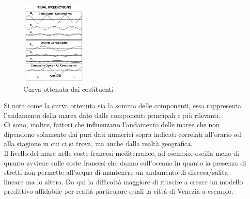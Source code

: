 \begin{figure}[H]
    \centering
    \includegraphics[width=0.3\textwidth]{res/cap 2/Tidal_constituent_sum.png}
    \caption{Curva ottenuta dai costituenti}
\end{figure}

Si nota come la curva ottenuta sia la somma delle componenti, essa rappresenta l'andamento della marea dato dalle componenti principali e più rilevanti.\\
Ci sono, inoltre, fattori che influenzano l'andamento delle maree che non dipendono solamente dai puri dati numerici sopra indicati correlati all'orario od alla stagione in cui ci si trova, ma anche dalla realtà geografica.\\
Il livello del mare nelle coste francesi mediterranee, ad esempio, oscilla meno di quanto avviene sulle coste francesi che danno sull'oceano in quanto la presenza di stretti non permette all'acqua di mantenere un andamento di discesa/salita lineare ma lo altera. Da qui la difficoltà maggiore di riuscire a creare un modello predittivo affidabile per realtà particolare quali la città di Venezia a esempio.
\newpage
